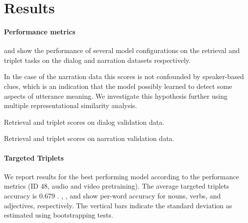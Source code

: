 \section{Results}
\label{sec:results}
\paragraph{Performance metrics}
 and  show
the performance of several model configurations on the retrieval and
triplet tasks on the dialog and narration datasets respectively.

In the case of the narration data this scores is not confounded by
speaker-based clues, which is an indication that the model possibly
learned to detect some aspects of utterance meaning. We investigate
this hypothesis further using multiple representational similarity
analysis.
 

 \begin{table}
   \centering
   
   \caption{Retrieval and triplet scores on dialog validation data.}
   \label{tab:scores-dialog}
 \end{table}

\begin{table}
   \centering
   
   \caption{Retrieval and triplet scores on narration validation data.}
   \label{tab:scores-narration}
 \end{table}
 
\paragraph{Targeted Triplets}

We report results for the best performing model according to the
performance metrics (ID 48, audio and video pretraining). The average
targeted triplets accuracy is 0.679
. ,
, and
 show per-word
accuracy for nouns, verbs, and adjectives, respectively. The vertical
bars indicate the standard deviation as estimated using bootstrapping
tests.

